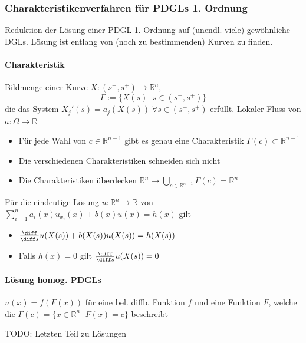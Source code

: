 \begin{sectionbox}
    \subsubsection{Charakteristikenverfahren für PDGLs 1. Ordnung}
    Reduktion der Lösung einer PDGL 1. Ordnung auf (unendl. viele) gewöhnliche DGLs. 
    Lösung ist entlang von (noch zu bestimmenden) Kurven zu finden. 

    \paragraph{Charakteristik} Bildmenge einer Kurve $X:(s^-,s^+)\rightarrow\mathbb R^n$,
    \begin{equation*}
        \Gamma := \{X(s) \, | \, s\in(s^-,s^+)\}
    \end{equation*}
    die das System $X_j'(s)=a_j(X(s)) \; \forall s\in(s^-,s^+)$ erfüllt. Lokaler Fluss von $a:\Omega\rightarrow\mathbb R$
    \begin{itemize}
        \item Für jede Wahl von $c\in\mathbb R^{n-1}$ gibt es genau eine Charakteristik $\Gamma(c)\subset\mathbb R^{n-1}$
        \item Die verschiedenen Charakteristiken schneiden sich nicht
        \item Die Charakteristiken überdecken $\mathbb R^n \rightarrow \bigcup_{c\in\mathbb R^{n-1}}\Gamma(c)=\mathbb R^n$
    \end{itemize}

    Für die eindeutige Lösung $u:\mathbb R^n\rightarrow \mathbb R$ von \\
    $\sum_{i=1}^{n}a_i(x)u_{x_i}(x) + b(x)u(x)=h(x)$ gilt
    \begin{itemize}
        \item $\frac{\diff}{\diff s}u(X(s)) + b(X(s))u(X(s))=h(X(s))$
        \item Falls $h(x)=0$ gilt $\frac{\diff}{\diff s}u(X(s)) = 0$
    \end{itemize}

    \paragraph{Lösung homog. PDGLs} $u(x) = f(F(x))$ für eine bel. diffb. Funktion $f$ und eine Funktion $F$, welche die $\Gamma(c)=\{x\in\mathbb R^n \, | \, F(x)=c\}$ beschreibt
\end{sectionbox}
TODO: Letzten Teil zu Lösungen